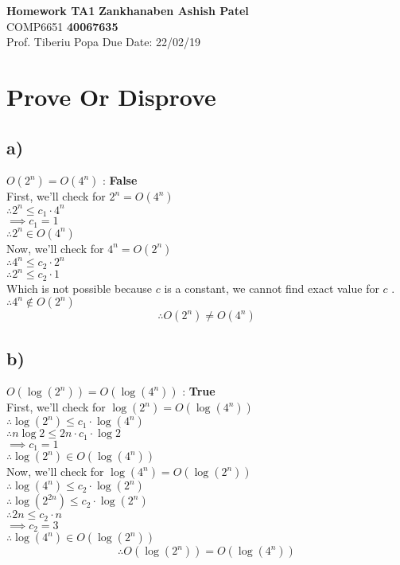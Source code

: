 \documentclass[a4paper, 11pt]{article}
\begin{document}
\noindent
\large\textbf{Homework TA1} \hfill \textbf{Zankhanaben Ashish Patel} \\
\normalsize COMP6651 \hfill \textbf{40067635} \\
Prof. Tiberiu Popa \hfill Due Date: 22/02/19 


\section{Prove Or Disprove}
\subsection*{a)}
\( O(2^n)= O(4^n)\) : \textbf{False}\\
First, we'll check for $2^n = O(4^n)$\\
$\therefore 2^n \le c_{1} \cdot 4^n$\\
$\implies c_{1}=1$\\
$\therefore 2^n \in O(4^n)$\\
Now, we'll check for $4^n = O(2^n)$\\
$\therefore 4^n \le c_{2} \cdot 2^n$\\
$\therefore 2^n \le c_{2} \cdot 1$ \\
Which is not possible because $c$ is a constant, we cannot find exact value for $c$ .\\
$\therefore 4^n \notin O(2^n)$
$$\therefore O(2^n) \ne O(4^n)$$

\subsection*{b)}
\( O(\log (2^n))= O(\log (4^n))\) : \textbf{True}\\
First, we'll check for $\log (2^n) = O(\log(4^n))$\\
$\therefore \log(2^n) \le c_{1} \cdot \log(4^n)$\\
$\therefore n\log 2 \le 2n \cdot c_{1} \cdot \log 2$\\
$\implies c_{1}=1$\\
$\therefore\log (2^n) \in O(\log(4^n))$\\
Now, we'll check for $\log(4^n) = O(\log(2^n))$\\
$\therefore \log(4^n) \le c_{2} \cdot \log (2^n)$\\
$\therefore \log(2^{2n}) \le c_{2} \cdot \log(2^n)$ \\
$\therefore 2n \le c_{2} \cdot n$\\
$\implies c_{2}=3$\\
$\therefore \log(4^n) \in O(\log(2^n))$
$$\therefore O(\log (2^n)) = O(\log (4^n))$$
\end{document}

